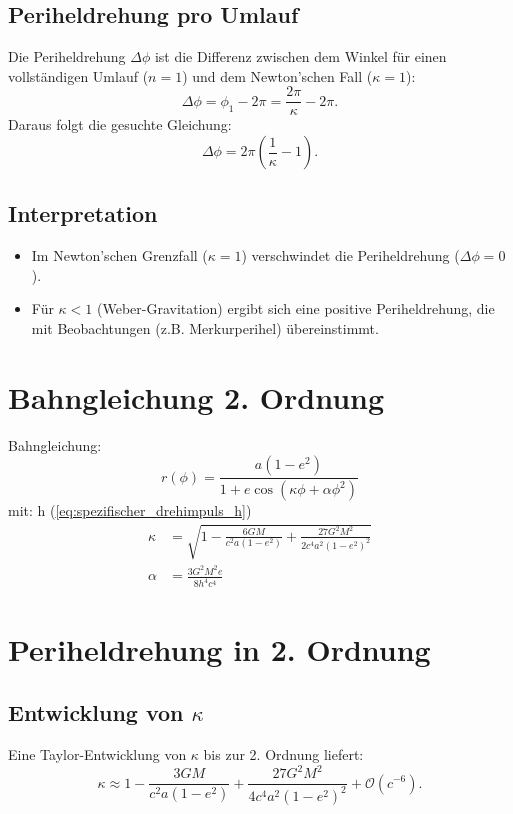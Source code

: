 \subsection{Periheldrehung pro Umlauf}
Die Periheldrehung $\Delta\phi$ ist die Differenz zwischen dem Winkel für einen vollständigen Umlauf ($n = 1$) und dem Newton'schen Fall ($\kappa = 1$):
\begin{equation}
\Delta\phi = \phi_1 - 2\pi = \frac{2\pi}{\kappa} - 2\pi.
\end{equation}
Daraus folgt die gesuchte Gleichung:
\begin{equation}
\boxed{\Delta\phi = 2\pi\left(\frac{1}{\kappa} - 1\right)}.
\end{equation}

\subsection{Interpretation}
\begin{itemize}
\item Im Newton'schen Grenzfall ($\kappa = 1$) verschwindet die Periheldrehung ($\Delta\phi = 0$).
\item Für $\kappa < 1$ (Weber-Gravitation) ergibt sich eine positive Periheldrehung, die mit Beobachtungen (z.B. Merkurperihel) übereinstimmt.
\end{itemize}

\section{Bahngleichung 2. Ordnung}
Bahngleichung:
\begin{equation}
    \boxed
    {
        r(\phi) = \frac{a(1-e^2)}{1 + e\cos\left(\kappa\phi + \alpha\phi^2\right)}
    }
\end{equation}
mit:
h (\ref{eq:spezifischer_drehimpuls_h})
\begin{align}
\kappa &= \sqrt{1 - \frac{6GM}{c^2a(1-e^2)} + \frac{27G^2M^2}{2c^4a^2(1-e^2)^2}}\\
\alpha &= \frac{3G^2M^2e}{8h^4c^4}
\end{align}

\section{Periheldrehung in 2. Ordnung}
\subsection{Entwicklung von $\kappa$}
Eine Taylor-Entwicklung von $\kappa$ bis zur 2. Ordnung liefert:
\begin{equation}
\kappa \approx 1 - \frac{3GM}{c^2 a(1 - e^2)} + \frac{27G^2 M^2}{4c^4 a^2 (1 - e^2)^2} + \mathcal{O}(c^{-6}).
\end{equation}

